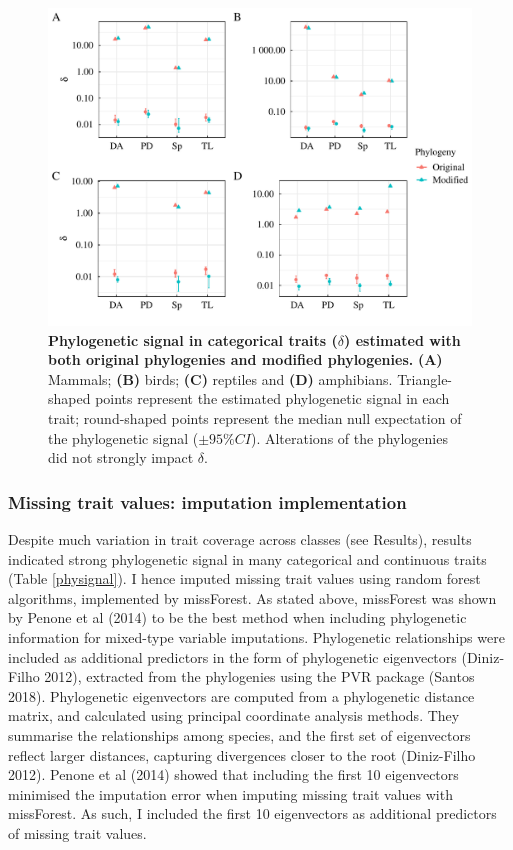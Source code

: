 \begin{figure}[h!]
\centering
\includegraphics[scale=0.7]{figures/chapter2/Phylosignal/Categorical}
\caption[Phylogenetic signal in categorical traits ($\delta$) estimated with both original phylogenies and modified phylogenies]{\textbf{Phylogenetic signal in categorical traits ($\delta$) estimated with both original phylogenies and modified phylogenies.} \textbf{(A)} Mammals; \textbf{(B)} birds; \textbf{(C)} reptiles and \textbf{(D)} amphibians. Triangle-shaped points represent the estimated phylogenetic signal in each trait; round-shaped points represent the median null expectation of the phylogenetic signal ($\pm95\%CI$). Alterations of the phylogenies did not strongly impact $\delta$.}
\label{signalcategorical}
\end{figure}

\subsubsection{Missing trait values: imputation implementation}
Despite much variation in trait coverage across classes (see Results), results indicated strong phylogenetic signal in many categorical and continuous traits (Table \ref{physignal}).
I hence imputed missing trait values using random forest algorithms, implemented by missForest. As stated above, missForest was shown by Penone et al (2014) to be the best method when including phylogenetic information for mixed-type variable imputations. Phylogenetic relationships were included as additional predictors in the form of phylogenetic eigenvectors (Diniz-Filho 2012), extracted from the phylogenies using the PVR package (Santos 2018). Phylogenetic eigenvectors are computed from a phylogenetic distance matrix, and calculated using principal coordinate analysis methods. They summarise the relationships among species, and the first set of eigenvectors reflect larger distances, capturing divergences closer to the root (Diniz-Filho 2012). Penone et al (2014) showed that including the first 10 eigenvectors minimised the imputation error when imputing missing trait values with missForest. As such, I included the first 10 eigenvectors as additional predictors of missing trait values.   

